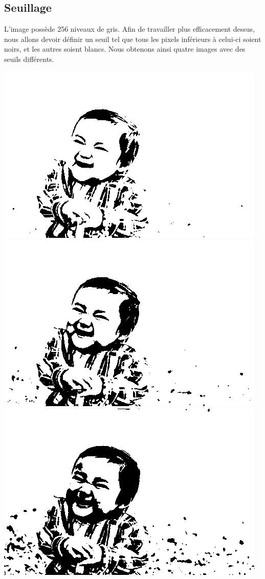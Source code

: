 \documentclass[a4paper,11pt]{article}
\begin{document}
\subsection{Seuillage}
L'image possède 256 niveaux de gris. Afin de travailler plus efficacement dessus, nous allons devoir définir un seuil tel que tous les pixels inférieurs à celui-ci soient noirs, et les autres soient blancs. Nous obtenons ainsi quatre images avec des seuils différents.
\begin{center}
\includegraphics[scale=0.15]{baby2c_90.png}
\includegraphics[scale=0.15]{baby2c_110.png}
\includegraphics[scale=0.15]{baby2c_128.png}

\end{center}
\end{document}
